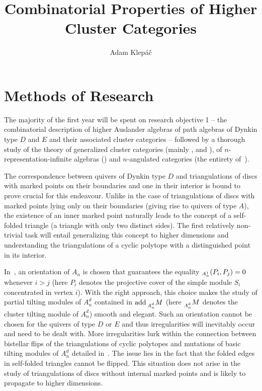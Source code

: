 \documentclass[a4paper,oneside,svgnames]{amsart}
\title{Combinatorial Properties of Higher Cluster Categories}
\author{Adam Klepáč}
\theoremstyle{plain}
\theoremstyle{definition}
\let\hom\relax
\DeclareMathOperator{\add}{add}
\DeclareMathOperator{\hom}{Hom}
\begin{document}
 \maketitle
 \section*{Methods of Research}
 \setcounter{section}{1}

 The majority of the first year will be spent on research objective 1 -- the
 combinatorial description of higher Auslander algebras of path algebras of
 Dynkin type $D$ and $E$ and their associated cluster categories -- followed by
 a thorough study of the theory of generalized cluster categories (mainly
 \cite[Sections 3 and 4]{amiot1}, \cite[Chapters 5,6 and 7]{amiot2} and
 \cite[Chapters 2 and 3]{guo}), of $n$-representation-infinite algebras
 (\cite[Sections 1-5]{hio}) and $n$-angulated categories (the entirety
 of~\cite{gko}).

 The correspondence between quivers of Dynkin type $D$ and triangulations of
 discs with marked points on their boundaries and one in their interior is bound
 to prove crucial for this endeavour. Unlike in the case of triangulations of
 discs with marked points lying only on their boundaries (giving rise to quivers
 of type $A$), the existence of an inner marked point naturally leads to the
 concept of a self-folded triangle (a triangle with only two distinct sides).
 The first relatively non-trivial task will entail generalizing this concept to
 higher dimensions and understanding the triangulations of a cyclic polytope
 with a distinguished point in its interior.

 In~\cite[Section 3]{ot}, an orientation of $A_n$ is chosen that guarantees the
 equality $\hom_{A^{1}_n}(P_i,P_j) = 0$ whenever $i > j$ (here $P_i$ denotes the
 projective cover of the simple module $S_i$ concentrated in vertex $i$). With
 the right approach, this choice makes the study of partial tilting modules of
 $A^{d}_n$ contained in $\add \prescript{}{A^{d}_n}{M}$ (here
 $\prescript{}{A^{d}_n}{M}$ denotes the cluster tilting module of $A^{d}_n$)
 smooth and elegant. Such an orientation cannot be chosen for the quivers of
 type $D$ or $E$ and thus irregularities will inevitably occur and need to be
 dealt with. More irregularities lurk within the connection between bistellar
 flips of the triangulations of cyclic polytopes and mutations of basic tilting
 modules of $A^{d}_n$ detailed in~\cite[Section 4]{ot}. The issue lies in the
 fact that the folded edges in self-folded triangles cannot be flipped. This
 situation does not arise in the study of triangulations of discs without
 internal marked points and is likely to propagate to higher dimensions.
\end{document}
